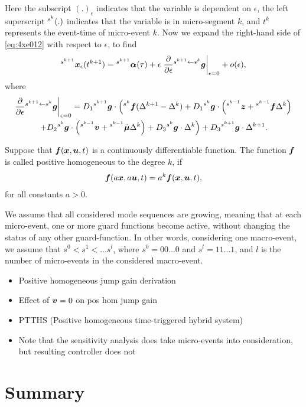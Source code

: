 \documentclass[../DC2017114Bouma.tex]{subfiles}
\begin{document}
Here the subscript $(.)_\epsilon$ indicates that the variable is dependent on $\epsilon$, the left superscript $\hspace{0cm}^{s^k}(.)$ indicates that the variable is in micro-segment $k$, and $t^k$ represents the event-time of micro-event $k$. Now we expand the right-hand side of \eqref{eq:4xe012} with respect to $\epsilon$, to find
\begin{align}
\hspace{0cm}^{s^{k+1}}{\boldsymbol{x}}_\epsilon(t^{k+1}) = \hspace{0cm}^{s^{k+1}}\boldsymbol{\alpha}(\tau) + \epsilon\left.\frac{\partial}{\partial\epsilon}\hspace{0cm}^{s^{k+1}\leftarrow s^k}{\boldsymbol{g}}\right|_{\epsilon=0} + o(\epsilon),\label{eq:4xe012exp}
\end{align}
where
\begin{multline}
\left.\frac{\partial}{\partial\epsilon}\hspace{0cm}^{s^{k+1}\leftarrow s^k}{\boldsymbol{g}}\right|_{\epsilon=0} = D_1\hspace{0cm}^{s^{k+1}}{\boldsymbol{g}}\cdot\left(\hspace{0cm}^{s^{k}}{\boldsymbol{f}}(\Delta^{k+1}-\Delta^{k}) + D_1\hspace{0cm}^{s^{k}}{\boldsymbol{g}}\cdot\left(\hspace{0cm}^{s^{k-1}}{\boldsymbol{z}}+\hspace{0cm}^{s^{k-1}}{\boldsymbol{f}}\Delta^{k}\right)\right. \\ \left.+ D_2\hspace{0cm}^{s^{k}}{\boldsymbol{g}}\cdot\left(\hspace{0cm}^{s^{k-1}}{\boldsymbol{v}}+\hspace{0cm}^{s^{k-1}}\dot{\boldsymbol{\mu}}\Delta^{k}\right) + D_3\hspace{0cm}^{s^{k}}{\boldsymbol{g}}\cdot\Delta^{k}\right)+D_3\hspace{0cm}^{s^{k+1}}{\boldsymbol{g}}\cdot\Delta^{k+1}. \label{eq:4dg1de}
\end{multline}

\begin{mydef}
Suppose that ${\boldsymbol{f}}({\boldsymbol{x}},{\boldsymbol{u}},t)$ is a continuously differentiable function. The function ${\boldsymbol{f}}$ is called positive homogeneous to the degree $k$, if 
\begin{align}
{\boldsymbol{f}}(a{\boldsymbol{x}},a{\boldsymbol{u}},t) = a^k{\boldsymbol{f}}({\boldsymbol{x}},{\boldsymbol{u}},t),
\end{align}
for all constants $a>0$.
\end{mydef}

\begin{myass}
We assume that all considered mode sequences are growing, meaning that at each micro-event, one or more guard functions become active, without changing the status of any other guard-function. In other words, considering one macro-event, we assume that $s^0<s^1<...s^l$, where $s^0= 00...0$ and $s^l = 11...1$, and $l$ is the number of micro-events in the considered macro-event.
\end{myass}

\begin{itemize}
\item Positive homogeneous jump gain derivation
\item Effect of ${\boldsymbol{v}} = 0$ on pos hom jump gain
\item PTTHS (Positive homogeneous time-triggered hybrid system)
\item Note that the sensitivity analysis does take micro-events into consideration, but resulting controller does not
\end{itemize}
%
%
%
%
%
%

\section{Summary}
\end{document}
